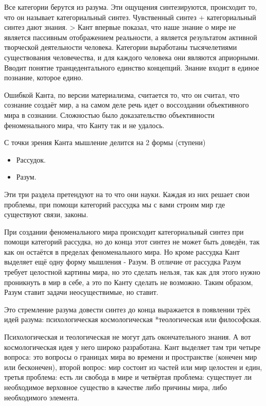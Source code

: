 Все категории берутся из разума. Эти ощущения синтезируются, происходит то, что он называет категориальный синтез. Чувственный синтез + категориальный синтез дают знания. > Кант впервые показал, что наше знание о мире не является пассивным отображением реальности, а является результатом активной творческой деятельности человека. Категории выработаны тысячелетиями существования человечества, и для каждого человека они являются априорными. Вводит понятие транцедентального единство концепций. Знание входит в единое познание, которое едино.

Ошибкой Канта, по версии материализма, считается то, что он считал, что сознание создаёт мир, а на самом деле речь идет о воссоздании объективного мира в сознании. Сложностью было доказательство объективности феноменального мира, что Канту так и не удалось.

С точки зрения Канта мышление делится на 2 формы (ступени)

\begin{itemize}
    \item Рассудок.
    \item Разум.
\end{itemize}
Эти три раздела претендуют на то что они науки. Каждая из них решает свои проблемы, при помощи категорий рассудка мы с вами строим мир где существуют связи, законы.

При создании феноменального мира происходит категориальный синтез при помощи категорий рассудка, но до конца этот синтез не может быть доведён, так как он остаётся в пределах феноменального мира. Но кроме рассудка Кант выделяет ещё одну форму мышления - Разум. В отличие от рассудка Разум требует целостной картины мира, но это сделать нельзя, так как для этого нужно проникнуть в мир в себе, а это по Канту сделать не возможно. Таким образом, Разум ставит задачи неосуществимые, но ставит.

Это стремление разума довести синтез до конца выражается в появлении трёх идей разума: психологическая космологическая *теологическая или философская.

Психологическая и теологическая не могут дать окончательного знания. А вот космологическая идея у него широко разработана. Кант выделяет там три четыре вопроса: это вопросы о границах мира во времени и пространстве (конечен мир или бесконечен), второй вопрос: мир состоит из частей или мир целостен и един, третья проблема: есть ли свобода в мире и четвёртая проблема: существует ли необходимое верховное существо в качестве либо причины мира, либо необходимого элемента.

